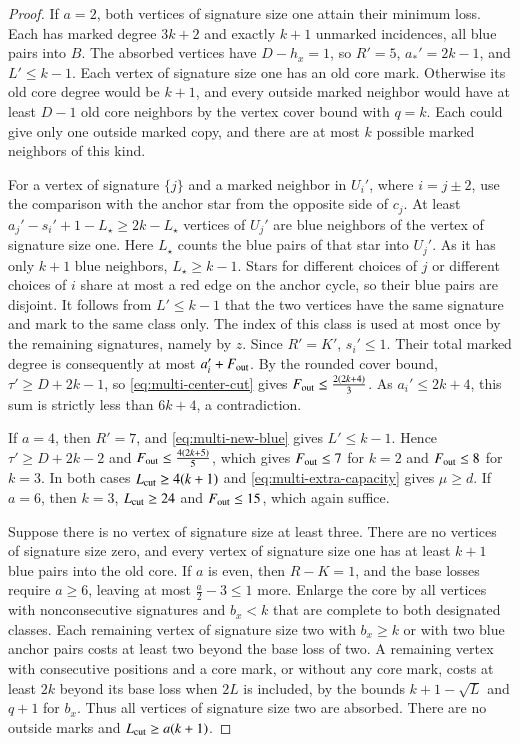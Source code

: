 \begin{proof}
If $a=2$, both vertices of signature size one attain their
minimum loss. Each has marked degree $3k+2$ and exactly $k+1$
unmarked incidences, all blue pairs into $B$. The absorbed
vertices have $D-h_x=1$, so $R'=5$, $a_*'=2k-1$, and
$L'\le k-1$. Each vertex of signature size one has an old core
mark. Otherwise its old core degree would be $k+1$, and every
outside marked neighbor would have at least $D-1$ old core
neighbors by the vertex cover bound with $q=k$. Each could give
only one outside marked copy, and there are at most $k$
possible marked neighbors of this kind.

For a vertex of signature $\{j\}$ and a marked neighbor in
$U_i'$, where $i=j\pm2$, use the comparison with the anchor
star from the opposite side of $c_j$. At least
$a_j'-s_i'+1-L_{\star}\ge2k-L_{\star}$ vertices of $U_j'$
are blue neighbors of the vertex of signature size one. Here
$L_{\star}$ counts the blue pairs of that star into $U_j'$.
As it has only $k+1$ blue neighbors, $L_{\star}\ge k-1$.
Stars for different choices of $j$ or different choices of
$i$ share at most a red edge on the anchor cycle, so their
blue pairs are disjoint. It follows from $L'\le k-1$ that the
two vertices have the same signature and mark to the same
class only. The index of this class is used at most once by
the remaining signatures, namely by $z$. Since $R'=K'$,
$s_i'\le1$. Their total marked degree is consequently at most
$a_i'+F_{\rm out}$. By the rounded cover bound,
$\tau'\ge D+2k-1$, so \eqref{eq:multi-center-cut} gives
$F_{\rm out}\le\frac{2(2k+4)}{3}$. As $a_i'\le2k+4$, this sum is
strictly less than $6k+4$, a contradiction.

If $a=4$, then $R'=7$, and \eqref{eq:multi-new-blue} gives
$L'\le k-1$. Hence $\tau'\ge D+2k-2$ and
$F_{\rm out}\le\frac{4(2k+5)}{5}$, which gives $F_{\rm out}\le7$ for $k=2$ and
$F_{\rm out}\le8$ for $k=3$. In both cases $L_{\rm cut}\ge4(k+1)$
and \eqref{eq:multi-extra-capacity} gives $\mu\ge d$.
If $a=6$, then $k=3$, $L_{\rm cut}\ge24$ and $F_{\rm out}\le15$,
which again suffice.

Suppose there is no vertex of signature size at least three.
There are no vertices of signature size zero, and every vertex
of signature size one has at least $k+1$ blue pairs into the
old core. If $a$ is even, then $R-K=1$, and the base losses
require $a\ge6$, leaving at most $\frac{a}{2}-3\le1$ more.
Enlarge the core by all vertices with nonconsecutive signatures
and $b_x<k$ that are complete to both designated classes.
Each remaining vertex of signature size two with $b_x\ge k$
or with two blue anchor pairs costs at least two beyond the
base loss of two. A remaining vertex with consecutive positions
and a core mark, or without any core mark, costs at least $2k$
beyond its base loss when $2L$ is included, by the bounds
$k+1-\sqrt L$ and $q+1$ for $b_x$. Thus all vertices of
signature size two are absorbed. There are no outside marks and
$L_{\rm cut}\ge a(k+1)$.


\end{proof}
